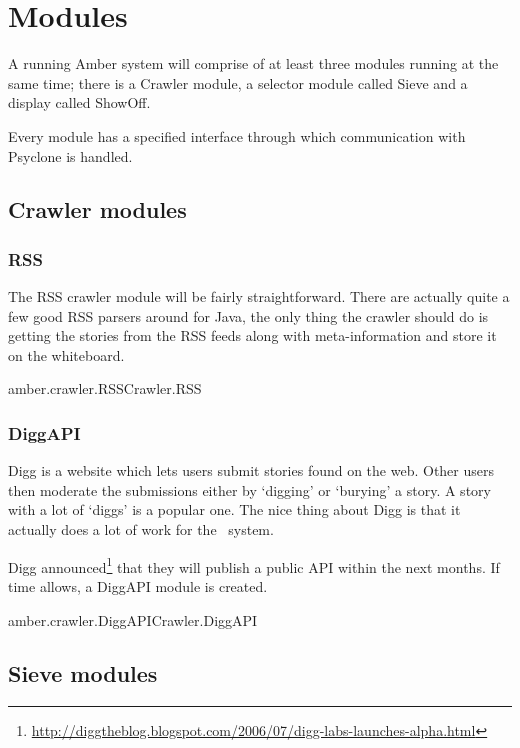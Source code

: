 \section{\label{sct:modules}Modules}

A running Amber system will comprise of at least three modules running at the
same time; there is a Crawler module, a selector module called Sieve and a
display called ShowOff.

Every module has a specified interface through which communication with
Psyclone is handled.

\subsection{Crawler modules}

\subsubsection{RSS}

The RSS crawler module will be fairly straightforward. There are actually quite
a few good RSS parsers around for Java, the only thing the crawler should do is
getting the stories from the RSS feeds along with meta-information and store it
on the whiteboard.

\begin{module}{amber.crawler.RSS}{Crawler.RSS}
\end{module}

\subsubsection{DiggAPI}

Digg is a website which lets users submit stories found on the web. Other users
then moderate the submissions either by `digging' or `burying' a story. A story
with a lot of `diggs' is a popular one. The nice thing about Digg is that it
actually does a lot of work for the \Amber\ system.

Digg
announced\footnote{\url{http://diggtheblog.blogspot.com/2006/07/digg-labs-launches-alpha.html}}
that they will publish a public API within the next months. If time allows, a
DiggAPI module is created.

\begin{module}{amber.crawler.DiggAPI}{Crawler.DiggAPI}
\end{module}

\subsection{Sieve modules}


